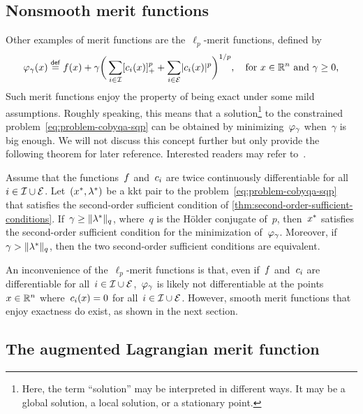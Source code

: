 \subsection{Nonsmooth merit functions}

Other examples of merit functions are the~$\ell_p$-merit functions, defined by
\begin{equation*}
    \merit_{\gamma}(\iter) \eqdef \obj(\iter) + \gamma \bigg( \sum_{i \in \iub} \posp{\con{i}(\iter)}^p + \sum_{i \in \ieq} \abs{\con{i}(\iter)}^p \bigg)^{1/p}, \quad \text{for~$\iter \in \R^n$ and~$\gamma \ge 0$,}
\end{equation*}
Such merit functions enjoy the property of being exact under some mild assumptions.
Roughly speaking, this means that a solution\footnote{Here, the term \enquote{solution} may be interpreted in different ways. It may be a global solution, a local solution, or a stationary point.} to the constrained problem~\cref{eq:problem-cobyqa-sqp} can be obtained by minimizing~$\merit_{\gamma}$ when~$\gamma$ is big enough.
We will not discuss this concept further but only provide the following theorem for later reference.
Interested readers may refer to~\cite{Han_Mangasarian_1979,Mayne_1980,Pillo_Grippo_1989}.

\begin{theorem}
    \label{thm:exact-merit-function}
    Assume that the functions~$f$ and~$c_{i}$ are twice continuously differentiable for all~$i \in \mathcal{I} \cup \mathcal{E}$.
    Let~$(\iter[\ast], \lm[\ast])$ be a \gls{kkt} pair to the problem~\cref{eq:problem-cobyqa-sqp} that satisfies the second-order sufficient condition of \cref{thm:second-order-sufficient-conditions}.
    If~$\gamma \ge \norm{\lm[\ast]}_q$, where~$q$ is the H{\"{o}}lder conjugate of~$p$, then~$\iter[\ast]$ satisfies the second-order sufficient condition for the minimization of~$\merit_{\gamma}$.
    Moreover, if~$\gamma > \norm{\lm[\ast]}_q$, then the two second-order sufficient conditions are equivalent.
\end{theorem}

An inconvenience of the~$\ell_p$-merit functions is that, even if~$f$ and~$c_{i}$ are differentiable for all~$i \in \mathcal{I} \cup \mathcal{E}$,~$\merit_{\gamma}$ is likely not differentiable at the points~$\iter \in \R^n$ where~$\con{i}(\iter) = 0$ for all~$i \in \mathcal{I} \cup \mathcal{E}$.
However, smooth merit functions that enjoy exactness do exist, as shown in the next section.

\subsection{The augmented Lagrangian merit function}

